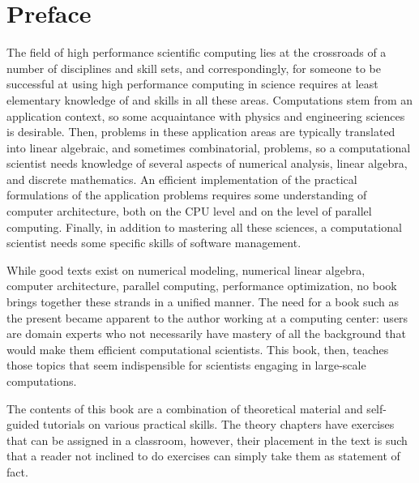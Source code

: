 
\thispagestyle{empty}
\section*{Preface}

The field of high performance scientific computing lies at the
crossroads of a number of disciplines and skill sets, and
correspondingly, for someone to be successful at using high performance
computing in science requires at least elementary knowledge of and
skills in all these areas.  Computations stem from an application
context, so some acquaintance with physics and engineering sciences is
desirable. Then, problems in these application areas are typically
translated into linear algebraic, and sometimes combinatorial,
problems, so a computational scientist needs knowledge of several
aspects of numerical analysis, linear algebra, and discrete
mathematics. An efficient implementation of the practical formulations
of the application problems requires some understanding of computer
architecture, both on the CPU level and on the level of parallel
computing. Finally, in addition to mastering all these sciences, a
computational scientist needs some specific skills of software
management.

While good texts exist on numerical
modeling, numerical linear algebra, computer architecture, parallel
computing, performance optimization, no book brings together these
strands in a unified manner. The need for a book such as the present
became apparent to the author working at a computing center:
users are domain experts who not necessarily have mastery
of all the background that would make them
efficient computational scientists. This book, then, teaches those
topics that seem indispensible for scientists
engaging in large-scale computations.

The contents of this book are a combination of theoretical material and
self-guided tutorials on various practical skills. The theory chapters
have exercises that can be assigned in a classroom, however, their
placement in the text is such that a reader not inclined to do
exercises can simply take them as statement of fact.

